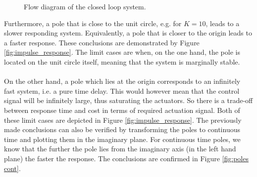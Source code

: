 \documentclass[a4paper,kul]{kulakarticle} %
\begin{document}
\begin{figure}[htp]
	\centering
	\caption{Flow diagram of the closed loop system. \cite{tikz}}
	\label{fig:flowdiagram}
\end{figure}
\newpage
\noindent Furthermore, a pole that is close to the unit circle, e.g. for $K = 10$, leads to a slower responding system. Equivalently, a pole that is closer to the origin leads to a faster response. These conclusions are demonstrated by Figure \ref{fig:impulse_response}. The limit cases are when, on the one hand, the pole is located on the unit circle itself, meaning that the system is marginally stable. 
\\\\
On the other hand, a pole which lies at the origin corresponds to an infinitely fast system, i.e. a pure time delay. This would however mean that the control signal will be infinitely large, thus saturating the actuators. So there is a trade-off between response time and cost in terms of required actuation signal. Both of these limit cases are depicted in Figure \ref{fig:impulse_response}. The previously made conclusions can also be verified by transforming the poles to continuous time and plotting them in the imaginary plane. For continuous time poles, we know that the further the pole lies from the imaginary axis (in the left hand plane) the faster the response. The conclusions are confirmed in Figure \ref{fig:poles cont}. 
\end{document}

